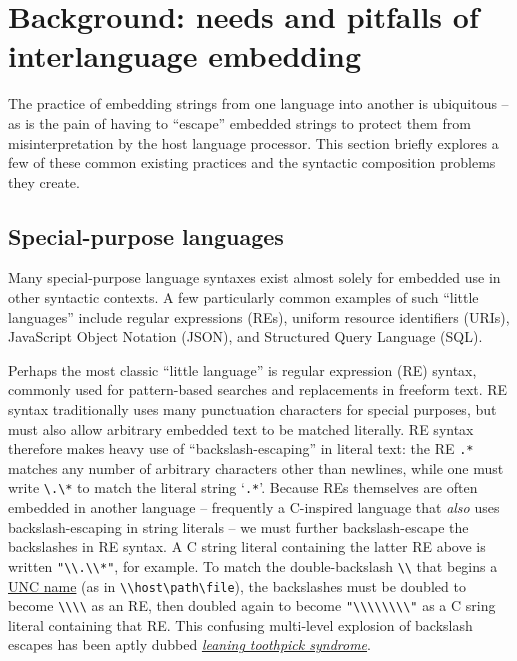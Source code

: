 \section{Background: needs and pitfalls of interlanguage embedding}
\label{sec:bg}

The practice of
embedding strings from one language into another
is ubiquitous --
as is the pain of having to ``escape'' embedded strings
to protect them from misinterpretation by the host language processor.
This section briefly explores a few of these common existing practices
and the syntactic composition problems they create.

\subsection{Special-purpose languages}

Many special-purpose language syntaxes exist
almost solely for embedded use in other syntactic contexts.
A few particularly common examples of such ``little languages''
include regular expressions (REs),
uniform resource identifiers (URIs),
JavaScript Object Notation (JSON),
and Structured Query Language (SQL).

Perhaps the most classic ``little language'' is regular expression (RE) syntax,
commonly used for pattern-based searches and replacements in freeform text.
RE syntax traditionally uses many punctuation characters for special purposes,
but must also allow arbitrary embedded text to be matched literally.
RE syntax therefore makes heavy use of ``backslash-escaping'' in literal text:
\eg the RE \verb|.*|
matches any number of arbitrary characters other than newlines,
while one must write \verb|\.\*| to match the literal string `\verb|.*|'.
Because REs themselves are often embedded in another language --
frequently a C-inspired language that \emph{also} uses backslash-escaping
in string literals --
we must further backslash-escape the backslashes in RE syntax.
A C string literal containing the latter RE above
is written \verb|"\\.\\*"|,
for example.
To match the double-backslash \verb|\\| that begins
a \href{https://en.wikipedia.org/wiki/Path_(computing)#Universal_Naming_Convention}{UNC name} (as in \verb|\\host\path\file|),
the backslashes must be doubled to become \verb|\\\\| as an RE,
then doubled again to become \verb|"\\\\\\\\"| as a C sring literal
containing that RE.
This confusing multi-level explosion of backslash escapes
has been aptly dubbed
\href{https://en.wikipedia.org/wiki/Leaning_toothpick_syndrome}{\emph{leaning toothpick syndrome}}.

